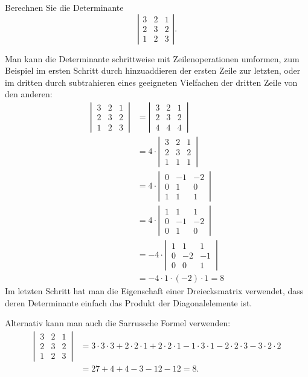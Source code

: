 Berechnen Sie die Determinante
\[
\left|\begin{matrix}
3&2&1\\
2&3&2\\
1&2&3
\end{matrix}\right|
.
\]

\begin{loesung}
Man kann die Determinante schrittweise mit Zeilenoperationen umformen,
zum Beispiel im ersten Schritt durch hinzuaddieren der ersten Zeile
zur letzten, oder im dritten durch subtrahieren eines geeigneten
Vielfachen der dritten Zeile von den anderen:
\begin{align*}
\left|\,\begin{matrix}
3&2&1\\
2&3&2\\
1&2&3
\end{matrix}\,\right|
&=
\left|\,\begin{matrix}
3&2&1\\
2&3&2\\
4&4&4
\end{matrix}\,\right|
\\&=
4\cdot \left|\,\begin{matrix}
3&2&1\\
2&3&2\\
1&1&1
\end{matrix}\,\right|
\\&=
4\cdot \left|\,\begin{matrix}
0&-1&-2\\
0& 1& 0\\
1& 1& 1
\end{matrix}\,\right|
\\&=
4\cdot \left|\,\begin{matrix}
1& 1& 1\\
0&-1&-2\\
0& 1& 0
\end{matrix}\,\right|
\\&=
-4\cdot \left|\,\begin{matrix}
1& 1& 1\\
0&-2&-1\\
0& 0& 1
\end{matrix}\,\right|
\\&=
-4\cdot 1\cdot (-2)\cdot 1=8
\end{align*}
Im letzten Schritt hat man die Eigenschaft einer Dreiecksmatrix verwendet,
dass deren Determinante einfach das Produkt der Diagonalelemente ist.

Alternativ kann man auch die Sarrussche Formel verwenden:
\begin{align*}
\left|\,\begin{matrix}
3&2&1\\
2&3&2\\
1&2&3
\end{matrix}\,\right|
&=
3\cdot 3\cdot 3+2\cdot 2\cdot 1 + 2\cdot 2\cdot 1
-1\cdot 3\cdot 1-2\cdot 2\cdot 3-3\cdot 2\cdot 2
\\
&=27+4+4-3-12-12=8.
\end{align*}
\end{loesung}
